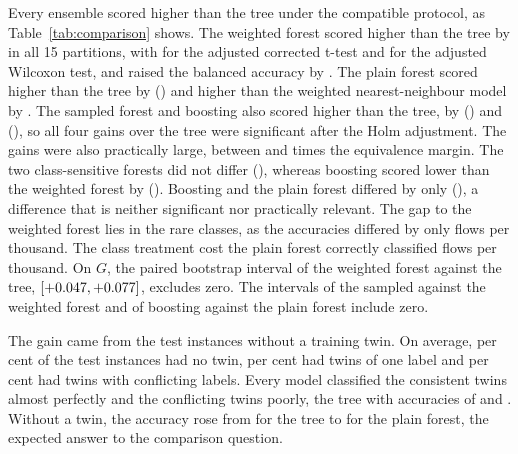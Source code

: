 \documentclass[10pt,conference]{IEEEtran}
\begin{document}
Every ensemble scored higher than the tree under the compatible protocol, as Table~\ref{tab:comparison} shows. The weighted forest scored higher than the tree by \OSCompRfWVsTreeMacroFAbsDiff{} in all 15 partitions, with \OSCompRfWVsTreeMacroFCor{} for the adjusted corrected t-test and \OSCompRfWVsTreeMacroFWil{} for the adjusted Wilcoxon test, and raised the balanced accuracy by \OSCompRfWVsTreeBalAccAbsDiff{}. The plain forest scored higher than the tree by \OSCompRfVsTreeMacroFAbsDiff{} (\OSCompRfVsTreeMacroFCor{}) and higher than the weighted nearest-neighbour model by \OSCompRfVsKnnCwMacroFAbsDiff{}. The sampled forest and boosting also scored higher than the tree, by \OSCompRfSVsTreeMacroFAbsDiff{} (\OSCompRfSVsTreeMacroFCor{}) and \OSCompBoostVsTreeMacroFAbsDiff{} (\OSCompBoostVsTreeMacroFCor{}), so all four gains over the tree were significant after the Holm adjustment. The gains were also practically large, between \OSCompBoostVsTreeMacroFMargins{} and \OSCompRfWVsTreeMacroFMargins{} times the equivalence margin. The two class-sensitive forests did not differ (\OSCompRfWVsRfSMacroFCor{}), whereas boosting scored lower than the weighted forest by \OSCompRfWVsBoostMacroFAbsDiff{} (\OSCompRfWVsBoostMacroFCor{}). Boosting and the plain forest differed by only \OSCompRfVsBoostMacroFAbsDiff{} (\OSCompRfVsBoostMacroFCor{}), a difference that is neither significant nor practically relevant. The gap to the weighted forest lies in the rare classes, as the accuracies differed by only \OSCompRfWVsBoostAccuracyPerK{} flows per thousand. The class treatment cost the plain forest \OSCompRfVsRfWAccuracyPerK{} correctly classified flows per thousand. On $G$, the paired bootstrap interval of the weighted forest against the tree, $[+0.047, +0.077]$, excludes zero. The intervals of the sampled against the weighted forest and of boosting against the plain forest include zero.

The gain came from the test instances without a training twin. On average, \OPCompShareNone{} per cent of the test instances had no twin, \OPCompShareCons{} per cent had twins of one label and \OPCompShareConf{} per cent had twins with conflicting labels. Every model classified the consistent twins almost perfectly and the conflicting twins poorly, the tree with accuracies of \OPCompTreeAccCons{} and \OPCompTreeAccConf{}. Without a twin, the accuracy rose from \OPCompTreeAccNone{} for the tree to \OPCompRfAccNone{} for the plain forest, the expected answer to the comparison question.
\end{document}
